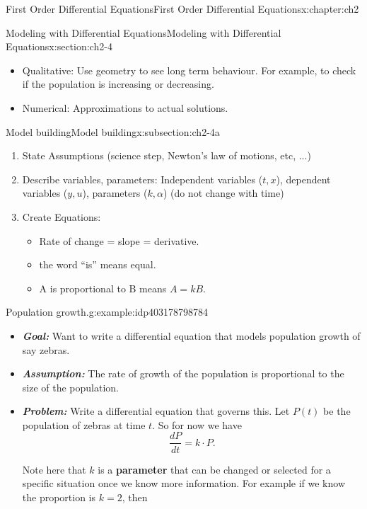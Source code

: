 \documentclass[oneside,10pt,]{book}
\newcommand{\alert}[1]{\textbf{\textit{#1}}}
\newcommand{\terminology}[1]{\textbf{#1}}
\numberwithin{equation}{section}
\numberwithin{equation}{section}
\begin{document}
\begin{chapterptx}{First Order Differential Equations}{}{First Order Differential Equations}{}{}{x:chapter:ch2}
\begin{sectionptx}{Modeling with Differential Equations}{}{Modeling with Differential Equations}{}{}{x:section:ch2-4}
\begin{introduction}{}
\begin{itemize}[label=\textbullet]
\item{}Qualitative: Use geometry to see long term behaviour. For example, to check if the population is increasing or decreasing.%
\item{}Numerical: Approximations to actual solutions.%
\end{itemize}
\end{introduction}%
%
%
\typeout{************************************************}
\typeout{************************************************}
%
\begin{subsectionptx}{Model building}{}{Model building}{}{}{x:subsection:ch2-4a}
%
\begin{enumerate}
\item{}State Assumptions (science step, Newton's law of motions, etc, ...)%
\item{}Describe variables, parameters: Independent variables (\(t,x\)), dependent variables (\(y,u\)), parameters (\(k,\alpha\)) (do not change with time)%
\item{}Create Equations:%
\begin{itemize}[label=\textbullet]
\item{}Rate of change = slope = derivative.%
\item{}the word ``is'' means equal.%
\item{}A is proportional to B means \(A=kB\).%
\end{itemize}
%
\end{enumerate}
\begin{example}{Population growth.}{g:example:idp403178798784}%
%
\begin{itemize}[label=\textbullet]
\item{}\alert{Goal:} Want to write a differential equation that models population growth of say zebras.%
\item{}\alert{Assumption:} The rate of growth of the population is proportional to the size of the population.%
\item{}\alert{Problem:} Write a differential equation that governs this. Let \(P(t)\) be the population of zebras at time \(t\). So for now we have%
\begin{equation*}
\frac{dP}{dt}=k\cdot P.
\end{equation*}
%
\par
Note here that \(k\) is a \terminology{parameter} that can be changed or selected for a specific situation once we know more information. For example if we know the proportion is \(k=2\), then%
\begin{equation*}

\end{equation*}
\end{itemize}
\end{example}
\end{subsectionptx}
\end{sectionptx}
\end{chapterptx}
\end{document}
